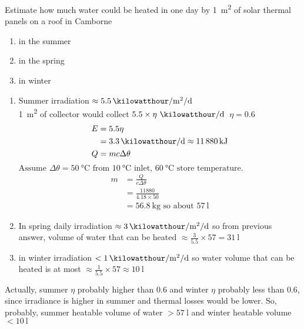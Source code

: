 \documentclass{article} %
\begin{document}
\begin{question}\label{qu:ex2}
Estimate how much water could be heated in one day by \SI{1}{\metre\squared} of solar thermal panels on a roof in Camborne
    \begin{enumerate}[label=\alph*)]
        \item in the summer
        \item in the spring
        \item in winter
    \end{enumerate}
\end{question}
\begin{solution}
    \begin{enumerate}[label=\alph*)]
        \item Summer irradiation $\approx \SI{5.5}{\kilowatthour\per\metre\squared\per\day}$\\
        \SI{1}{\metre\squared} of collector would collect $5.5 \times \eta\ \si{\kilowatthour\per\day}$\
        $\eta=0.6$\\
        \begin{align*}
        E&=5.5\eta\\
        &=\SI{3.3}{\kilowatthour\per\day}\approx \SI{11880}{\kilo\joule}\\
        Q&=mc\Delta\theta\\
        \end{align*}
        $\text{Assume\ } \Delta\theta=\SI{50}{\celsius}\text{\ from\ }\SI{10}{\celsius}\text{\ inlet,\ } \SI{60}{\celsius}\text{\ store temperature.}$\\
    \begin{align*}
    m&=\frac{Q}{c\Delta\theta}\\
   &=\frac{11880}{4.18\times 50}\\
    &=\SI{56.8}{\kg}\text{\ so\ about\ }\SI{57}{\litre}
    \end{align*}
        \item In spring daily irradiation $\approx  \SI{3}{\kilowatthour\per\metre\squared\per\day}$ so from previous answer, volume of water that can be heated $\approx\frac{3}{5.5}\times 57=\SI{31}{\litre}$
        \item in winter irradiation $< \SI{1}{\kilowatthour\per\metre\squared\per\day}$ so water volume that can be heated is at most $\approx\frac{1}{5.5}\times 57\approx\SI{10}{\litre}$
    \end{enumerate}
Actually, summer $\eta$ probably higher than 0.6 and winter $\eta$ probably less than 0.6, since irradiance is higher in summer and thermal losses would be lower. So, probably, summer heatable volume of water $> \SI{57}{\litre}$ and winter heatable volume $< \SI{10}{\litre}$
\end{solution}
\end{document}
